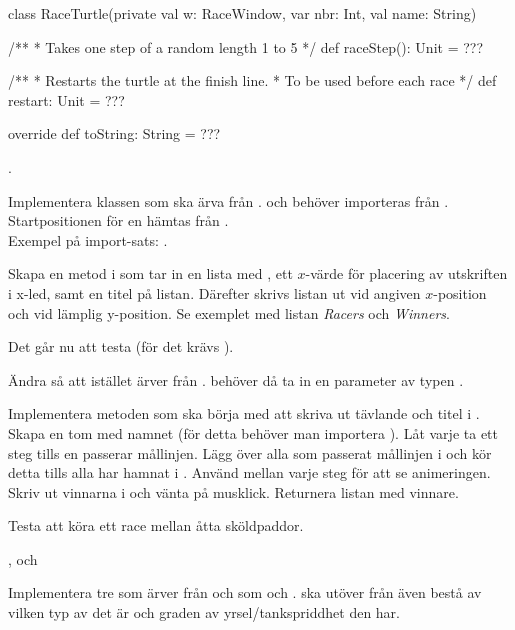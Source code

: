 \begin{Code}
class RaceTurtle(private val w: RaceWindow,
var nbr: Int, val name: String) {
/**
* Takes one step of a random length 1 to 5
*/
def raceStep(): Unit = ???

/**
* Restarts the turtle at the finish line.
* To be used before each race
*/
def restart: Unit = ???

override def toString: String = ???
}
\end{Code}

\Task {}.

\Subtask Implementera klassen  som ska ärva från .  och  behöver importeras från . Startpositionen för en  hämtas från .\\Exempel på import-sats: .

\Subtask Skapa en metod  i  som tar in en lista med , ett $x$-värde för placering av utskriften i x-led, samt en titel på listan. Därefter skrivs listan ut vid angiven $x$-position och vid lämplig y-position. Se exemplet med listan \textit{Racers} och \textit{Winners}.

\Subtask Det går nu att testa  (för det krävs ).

\Subtask Ändra så att  istället ärver från .  behöver då ta in en parameter av typen .

\Task {}

\Subtask Implementera metoden  som ska börja med att skriva ut tävlande och titel i . Skapa en tom  med namnet  (för detta behöver man importera ). Låt varje  ta ett steg tills en passerar mållinjen. Lägg över alla som passerat mållinjen i  och kör detta tills alla  har hamnat i . Använd  mellan varje steg för att se animeringen. Skriv ut vinnarna i  och vänta på musklick. Returnera listan med vinnare.

\Subtask Testa att köra ett race mellan åtta sköldpaddor.

\Task {},  och 

\Subtask Implementera tre  som ärver från  och som   och .  ska utöver  från  även bestå av vilken typ av  det är och graden av yrsel/tankspriddhet den har.

